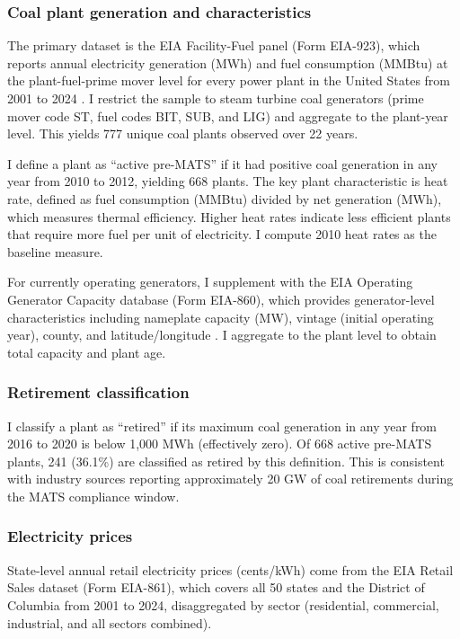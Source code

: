 \documentclass[12pt]{article}
\begin{document}
\subsubsection*{Coal plant generation and characteristics} The primary dataset is the EIA Facility-Fuel panel (Form EIA-923), which reports annual electricity generation (MWh) and fuel consumption (MMBtu) at the plant-fuel-prime mover level for every power plant in the United States from 2001 to 2024 \citep{eia2016form923}. I restrict the sample to steam turbine coal generators (prime mover code ST, fuel codes BIT, SUB, and LIG) and aggregate to the plant-year level. This yields 777 unique coal plants observed over 22 years.

I define a plant as ``active pre-MATS'' if it had positive coal generation in any year from 2010 to 2012, yielding 668 plants. The key plant characteristic is heat rate, defined as fuel consumption (MMBtu) divided by net generation (MWh), which measures thermal efficiency. Higher heat rates indicate less efficient plants that require more fuel per unit of electricity. I compute 2010 heat rates as the baseline measure.

For currently operating generators, I supplement with the EIA Operating Generator Capacity database (Form EIA-860), which provides generator-level characteristics including nameplate capacity (MW), vintage (initial operating year), county, and latitude/longitude \citep{eia2016form860}. I aggregate to the plant level to obtain total capacity and plant age.

\subsubsection*{Retirement classification} I classify a plant as ``retired'' if its maximum coal generation in any year from 2016 to 2020 is below 1,000 MWh (effectively zero). Of 668 active pre-MATS plants, 241 (36.1\%) are classified as retired by this definition. This is consistent with industry sources reporting approximately 20 GW of coal retirements during the MATS compliance window.

\subsubsection*{Electricity prices} State-level annual retail electricity prices (cents/kWh) come from the EIA Retail Sales dataset (Form EIA-861), which covers all 50 states and the District of Columbia from 2001 to 2024, disaggregated by sector (residential, commercial, industrial, and all sectors combined).
\end{document}
